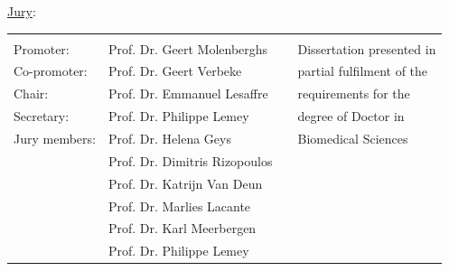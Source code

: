 \begin{titlepage}
{\vspace{1.9cm}
\begin{minipage}{0.4\textwidth}                                                    %
\begin{flushleft}   \small                                                        %
\hspace{0.3cm}\underline{Jury}:
\begin{tabular}{llp{0.5cm}l}
                 \vspace{0.2cm}  & \vspace{0.2cm}  &&\\
                 \hspace{0.1cm} Promoter: & Prof. Dr. Geert Molenberghs&& Dissertation presented in  \\
                 \hspace{0.1cm} Co-promoter: & Prof. Dr. Geert Verbeke&&  partial fulfilment of the \\
                 \hspace{0.1cm} Chair: & Prof. Dr. Emmanuel Lesaffre&&  requirements for the \\
                 \hspace{0.1cm} Secretary: &Prof. Dr. Philippe Lemey && degree of Doctor in \\
                 \hspace{0.1cm} Jury members: & Prof. Dr. Helena Geys&&  Biomedical Sciences\\
                                                & Prof. Dr. Dimitris Rizopoulos && \\
                                                &  Prof. Dr. Katrijn Van Deun  && \\
                                                &  Prof. Dr. Marlies Lacante  &&\\
                                                &  Prof. Dr. Karl Meerbergen  &&\\
                                                &  Prof. Dr. Philippe Lemey  &&
               \end{tabular}%
\end{flushleft}                                                                     %
\end{minipage}                                                   %

\vspace{1.7cm}
\begin{center}
\end{center}



}

\end{titlepage}
\clearpage
